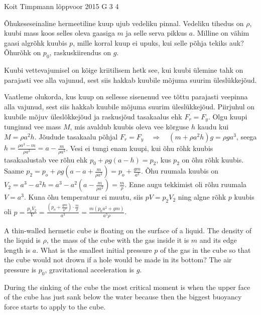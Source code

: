 {Koit Timpmann} %
{lõppvoor} %
{2015} %
{G 3} %
{4} %
{
\ifStatement
Õhukeseseinaline hermeetiline kuup ujub vedeliku pinnal. Vedeliku tihedus on $\rho$, kuubi mass koos selles oleva gaasiga $m$ ja selle serva pikkus $a$. Milline on vähim gaasi algrõhk kuubis $p$, mille korral kuup ei upuks, kui selle põhja tekiks auk? Õhurõhk on $p_0$, raskuskiirendus on $g$.
\fi


\ifHint
Kuubi vettevajumisel on kõige kriitilisem hetk see, kui kuubi ülemine tahk on parajasti vee alla vajunud, sest siis hakkab kuubile mõjuma suurim üleslükkejõud.
\fi


\ifSolution
Vaatleme olukorda, kus kuup on sellesse sisenenud vee tõttu parajasti veepinna alla vajunud, sest siis hakkab kuubile  mõjuma suurim üleslükkejõud. Piirjuhul on kuubile mõjuv üleslõkkejõud ja raskusjõud tasakaalus ehk $F_r = F_y$. Olgu kuupi tunginud vee mass $M$, mis avaldub kuubis oleva vee kõrguse $h$ kaudu kui $M = \rho a^2h$. Jõudude tasakaalu põhjal $F_r = F_y \quad\Rightarrow\quad (m + \rho a^2h)g=\rho ga^3$, seega $h = \frac{\rho a^3 - m}{\rho a^2} = a - \frac{m}{\rho a^2}$. Vesi ei tungi enam kuupi, kui õhu rõhk kuubis tasakaalustab vee rõhu ehk $p_0 + \rho g(a-h) = p_2$, kus $p_2$ on õhu rõhk kuubis. Saame $p_2 = p_o + \rho g\left(a - a + \frac{m}{\rho a^2}\right) = p_o +  \frac{gm}{a^2}$. Õhu ruumala kuubis on $V_2 = a^3 - a^2h = a^3 - a^2\left(a - \frac{m}{\rho a^2}\right) = \frac{m}{\rho}$. Enne augu tekkimist oli rõhu ruumala $V=a^3$. Kuna õhu temperatuur ei muutu, siis $pV = p_2V_2$ ning algne rõhk $p$ kuubis oli
$p = \frac{p_2V_2}{V} = \frac{ \left( p_o +  \frac{gm}{a^2} \right) \cdot \frac{m}{\rho}}{a^3} = \frac{m(p_0a^2 + gm)}{a^5\rho}$.
\fi


\ifEngStatement
A thin-walled hermetic cube is floating on the surface of a liquid. The density of the liquid is $\rho$, the mass of the cube with the gas inside it is $m$ and its edge length is $a$. What is the smallest initial pressure $p$ of the gas in the cube so that the cube would not drown if a hole would be made in its bottom? The air pressure is $p_0$, gravitational acceleration is $g$.
\fi


\ifEngHint
During the sinking of the cube the most critical moment is when the upper face of the cube has just sank below the water because then the biggest buoyancy force starts to apply to the cube.
\fi


}
